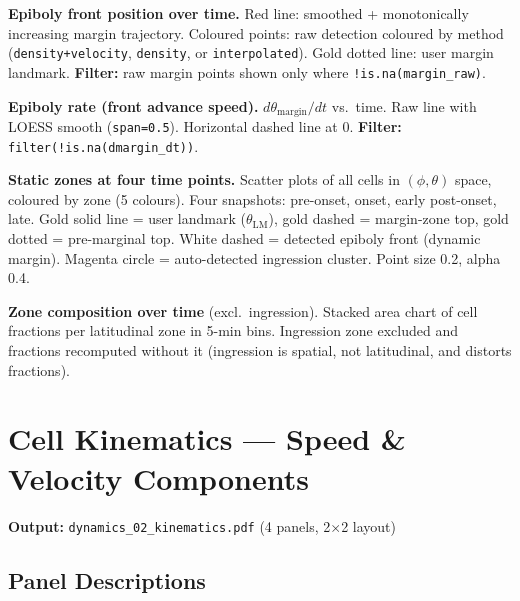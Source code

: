 \documentclass[11pt,a4paper]{article}
\begin{document}
\begin{description}[style=nextline,leftmargin=1.5cm]
  \item[01a] \textbf{Epiboly front position over time.}
    Red line: smoothed + monotonically increasing margin trajectory.
    Coloured points: raw detection coloured by method
    (\texttt{density+velocity}, \texttt{density}, or \texttt{interpolated}).
    Gold dotted line: user margin landmark.
    \textbf{Filter:} raw margin points shown only where
    \texttt{!is.na(margin\_raw)}.

  \item[01b] \textbf{Epiboly rate (front advance speed).}
    $d\theta_\mathrm{margin}/dt$ vs.\ time.
    Raw line with LOESS smooth (\texttt{span=0.5}).
    Horizontal dashed line at 0.
    \textbf{Filter:} \texttt{filter(!is.na(dmargin\_dt))}.

  \item[01c] \textbf{Static zones at four time points.}
    Scatter plots of all cells in $(\phi,\theta)$ space, coloured by zone
    (5 colours).  Four snapshots: pre-onset, onset, early post-onset, late.
    Gold solid line = user landmark ($\theta_\mathrm{LM}$), gold dashed =
    margin-zone top, gold dotted = pre-marginal top.
    White dashed = detected epiboly front (dynamic margin).
    Magenta circle = auto-detected ingression cluster.
    Point size 0.2, alpha 0.4.

  \item[01d] \textbf{Zone composition over time} (excl.\ ingression).
    Stacked area chart of cell fractions per latitudinal zone in 5-min bins.
    Ingression zone excluded and fractions recomputed without it (ingression
    is spatial, not latitudinal, and distorts fractions).
\end{description}


\section{Cell Kinematics --- Speed \& Velocity Components}
\label{fig:kinematics}

\noindent\textbf{Output:} \texttt{dynamics\_02\_kinematics.pdf}
(4 panels, 2$\times$2 layout)

\subsection*{Panel Descriptions}
\end{document}
